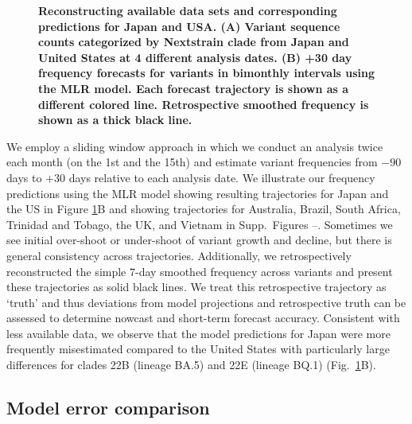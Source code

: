 \documentclass[10pt,letterpaper]{article}
\begin{document}
\begin{figure}[tb!]
	\centering
	\caption{
		\bf{Reconstructing available data sets and corresponding predictions for Japan and USA.}
		(A) Variant sequence counts categorized by Nextstrain clade from Japan and United States at 4 different analysis dates.
		(B) +30 day frequency forecasts for variants in bimonthly intervals using the MLR model.
		Each forecast trajectory is shown as a different colored line.
		Retrospective smoothed frequency is shown as a thick black line.
	}
	\label{fig:Fig1}
\end{figure}

We employ a sliding window approach in which we conduct an analysis twice each month (on the 1st and the 15th) and estimate variant frequencies from $-90$ days to $+30$ days relative to each analysis date.
We illustrate our frequency predictions using the MLR model showing resulting trajectories for Japan and the US in Figure \ref{fig:Fig1}B and showing trajectories for Australia, Brazil, South Africa, Trinidad and Tobago, the UK, and Vietnam in Supp.\ Figures --.
Sometimes we see initial over-shoot or under-shoot of variant growth and decline, but there is general consistency across trajectories.
Additionally, we retrospectively reconstructed the simple 7-day smoothed frequency across variants and present these trajectories as solid black lines.
We treat this retrospective trajectory as `truth' and thus deviations from model projections and retrospective truth can be assessed to determine nowcast and short-term forecast accuracy.
Consistent with less available data, we observe that the model predictions for Japan were more frequently misestimated compared to the United States with particularly large differences for clades 22B (lineage BA.5) and 22E (lineage BQ.1) (Fig.~\ref{fig:Fig1}B).



\subsection*{Model error comparison}
\end{document}
